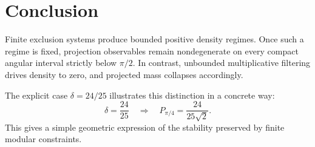 \documentclass[11pt]{article}
\theoremstyle{plain}
\theoremstyle{definition}
\begin{document}
\section{Conclusion}

Finite exclusion systems produce bounded positive density regimes. Once such a regime is fixed, projection observables remain nondegenerate on every compact angular interval strictly below $\pi/2$. In contrast, unbounded multiplicative filtering drives density to zero, and projected mass collapses accordingly.

The explicit case $\delta=24/25$ illustrates this distinction in a concrete way:
\[
\delta=\frac{24}{25}
\quad\Longrightarrow\quad
P_{\pi/4}=\frac{24}{25\sqrt{2}}.
\]
This gives a simple geometric expression of the stability preserved by finite modular constraints.
\end{document}

